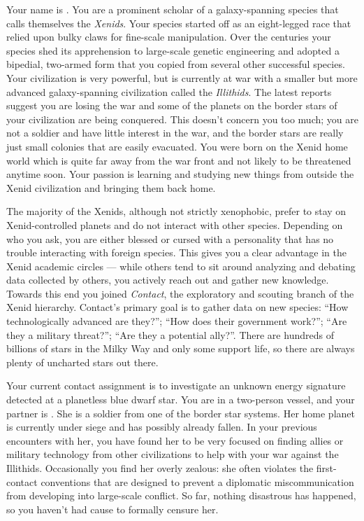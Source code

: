 \documentclass[char]{guildcamp1}
\begin{document}
\name{\cPassive{}}

Your name is \cPassive{}. You are a prominent scholar of a galaxy-spanning species that calls themselves the \emph{Xenids}. Your species started off as an eight-legged race that relied upon bulky claws for fine-scale manipulation. Over the centuries your species shed its apprehension to large-scale genetic engineering and adopted a bipedial, two-armed form that you copied from several other successful species. Your civilization is very powerful, but is currently at war with a smaller but more advanced galaxy-spanning civilization called the \emph{Illithids}. The latest reports suggest you are losing the war and some of the planets on the border stars of your civilization are being conquered. This doesn't concern you too much; you are not a soldier and have little interest in the war, and the border stars are really just small colonies that are easily evacuated. You were born on the Xenid home world which is quite far away from the war front and not likely to be threatened anytime soon. Your passion is learning and studying new things from outside the Xenid civilization and bringing them back home.

The majority of the Xenids, although not strictly xenophobic, prefer to stay on Xenid-controlled planets and do not interact with other species. Depending on who you ask, you are either blessed or cursed with a personality that has no trouble interacting with foreign species. This gives you a clear advantage in the Xenid academic circles --- while others tend to sit around analyzing and debating data collected by others, you actively reach out and gather new knowledge. Towards this end you joined \emph{Contact}, the exploratory and scouting branch of the Xenid hierarchy. Contact's primary goal is to gather data on new species: ``How technologically advanced are they?''; ``How does their government work?''; ``Are they a military threat?''; ``Are they a potential ally?''. There are hundreds of billions of stars in the Milky Way and only some support life, so there are always plenty of uncharted stars out there.

Your current contact assignment is to investigate an unknown energy signature detected at a planetless blue dwarf star. You are in a two-person vessel, and your partner is \cActive{}. She is a soldier from one of the border star systems. Her home planet is currently under siege and has possibly already fallen. In your previous encounters with her, you have found her to be very focused on finding allies or military technology from other civilizations to help with your war against the Illithids. Occasionally you find her overly zealous: she often violates the first-contact conventions that are designed to prevent a diplomatic miscommunication from developing into large-scale conflict. So far, nothing disastrous has happened, so you haven't had cause to formally censure her.
\end{document}
